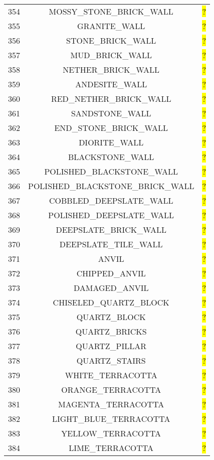 \documentclass[11pt]{article}
\newcommand\myworries[1]{\sethlcolor{red}\hl{#1}}
\begin{document}
\begin{longtable}{ |c|c|c| }
	354 & MOSSY\_STONE\_BRICK\_WALL & \myworries{?} \\
	355 & GRANITE\_WALL & \myworries{?} \\
	356 & STONE\_BRICK\_WALL & \myworries{?} \\
	357 & MUD\_BRICK\_WALL & \myworries{?} \\
	358 & NETHER\_BRICK\_WALL & \myworries{?} \\
	359 & ANDESITE\_WALL & \myworries{?} \\
	360 & RED\_NETHER\_BRICK\_WALL & \myworries{?} \\
	361 & SANDSTONE\_WALL & \myworries{?} \\
	362 & END\_STONE\_BRICK\_WALL & \myworries{?} \\
	363 & DIORITE\_WALL & \myworries{?} \\
	364 & BLACKSTONE\_WALL & \myworries{?} \\
	365 & POLISHED\_BLACKSTONE\_WALL & \myworries{?} \\
	366 & POLISHED\_BLACKSTONE\_BRICK\_WALL & \myworries{?} \\
	367 & COBBLED\_DEEPSLATE\_WALL & \myworries{?} \\
	368 & POLISHED\_DEEPSLATE\_WALL & \myworries{?} \\
	369 & DEEPSLATE\_BRICK\_WALL & \myworries{?} \\
	370 & DEEPSLATE\_TILE\_WALL & \myworries{?} \\
	371 & ANVIL & \myworries{?} \\
	372 & CHIPPED\_ANVIL & \myworries{?} \\
	373 & DAMAGED\_ANVIL & \myworries{?} \\
	374 & CHISELED\_QUARTZ\_BLOCK & \myworries{?} \\
	375 & QUARTZ\_BLOCK & \myworries{?} \\
	376 & QUARTZ\_BRICKS & \myworries{?} \\
	377 & QUARTZ\_PILLAR & \myworries{?} \\
	378 & QUARTZ\_STAIRS & \myworries{?} \\
	379 & WHITE\_TERRACOTTA & \myworries{?} \\
	380 & ORANGE\_TERRACOTTA & \myworries{?} \\
	381 & MAGENTA\_TERRACOTTA & \myworries{?} \\
	382 & LIGHT\_BLUE\_TERRACOTTA & \myworries{?} \\
	383 & YELLOW\_TERRACOTTA & \myworries{?} \\
	384 & LIME\_TERRACOTTA & \myworries{?} \\

\end{longtable}
\end{document}
